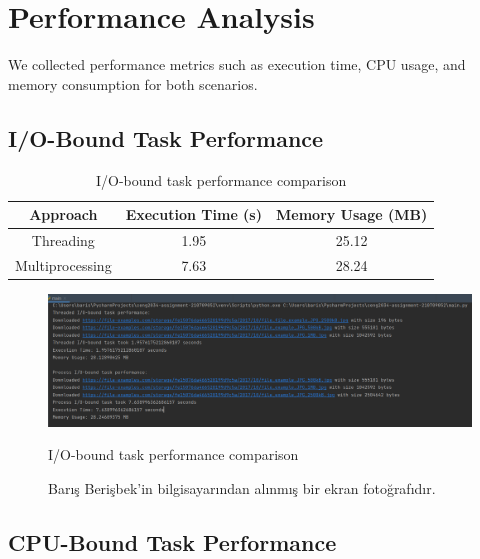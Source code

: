 \documentclass[onecolumn]{article}
\begin{document}
\section{Performance Analysis}
We collected performance metrics such as execution time, CPU usage, and memory consumption for both scenarios.

\subsection{I/O-Bound Task Performance}
\begin{table}[h!]
\centering
\begin{tabular}{|c|c|c|}
\hline
\textbf{Approach} & \textbf{Execution Time (s)} & \textbf{Memory Usage (MB)} \\
\hline
Threading & 1.95 & 25.12 \\
\hline
Multiprocessing & 7.63 & 28.24 \\
\hline
\end{tabular}
\caption{I/O-bound task performance comparison}
\end{table}

\begin{figure}[ht!]
    \centering
    \includegraphics[width=1\textwidth]{pictures/iobound1.png}
    \caption{I/O-bound task performance comparison}
    \caption{Barış Berişbek'in bilgisayarından alınmış bir ekran fotoğrafıdır.}
\end{figure}

\subsection{CPU-Bound Task Performance}
\end{document}
